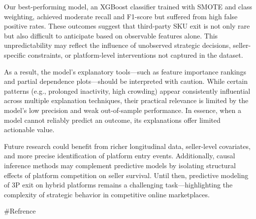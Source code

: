 \documentclass[
  letterpaper,
  DIV=11,
  numbers=noendperiod]{scrartcl}
\begin{document}
Our best-performing model, an XGBoost classifier trained with SMOTE and
class weighting, achieved moderate recall and F1-score but suffered from
high false positive rates. These outcomes suggest that third-party SKU
exit is not only rare but also difficult to anticipate based on
observable features alone. This unpredictability may reflect the
influence of unobserved strategic decisions, seller-specific
constraints, or platform-level interventions not captured in the
dataset.

As a result, the model's explanatory tools---such as feature importance
rankings and partial dependence plots---should be interpreted with
caution. While certain patterns (e.g., prolonged inactivity, high
crowding) appear consistently influential across multiple explanation
techniques, their practical relevance is limited by the model's low
precision and weak out-of-sample performance. In essence, when a model
cannot reliably predict an outcome, its explanations offer limited
actionable value.

Future research could benefit from richer longitudinal data,
seller-level covariates, and more precise identification of platform
entry events. Additionally, causal inference methods may complement
predictive models by isolating structural effects of platform
competition on seller survival. Until then, predictive modeling of 3P
exit on hybrid platforms remains a challenging task---highlighting the
complexity of strategic behavior in competitive online marketplaces.

\#Refrence
\end{document}

